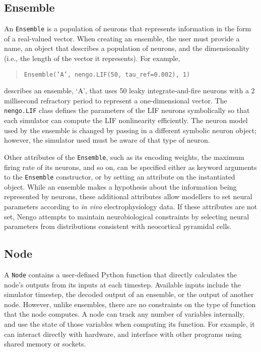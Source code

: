 \documentclass{frontiersSCNS}
\begin{document}
\subsection{Ensemble}

An \texttt{Ensemble} is
a population of neurons
that represents information
in the form of a real-valued vector.
When creating an ensemble,
the user must provide a name,
an object that describes
a population of neurons,
and the dimensionality
(i.e., the length of the vector it represents).
For example,
\begin{quote}
  \texttt{Ensemble('A', nengo.LIF(50, tau\_ref=0.002), 1)}
\end{quote}
describes an ensemble, `A',
that uses 50 leaky integrate-and-fire neurons \citep{lapicque1907}
with a 2 millisecond refractory period
to represent a one-dimensional vector.
The \texttt{nengo.LIF} class defines
the parameters of the LIF neurons symbolically
so that each simulator can compute
the LIF nonlinearity efficiently.
The neuron model used by the ensemble
is changed by passing in a different symbolic neuron object;
however, the simulator used must be aware
of that type of neuron.

Other attributes of the \texttt{Ensemble},
such as its encoding weights,
the maximum firing rate of its neurons,
and so on, can be specified
either as keyword arguments
to the \texttt{Ensemble} constructor,
or by setting an attribute on the instantiated object.
While an ensemble makes a hypothesis
about the information being represented by neurons,
these additional attributes
allow modellers to set
neural parameters according to \textit{in vivo}
electrophysiology data.
If these attributes are not set,
Nengo attempts to maintain
neurobiological constraints
by selecting neural parameters
from distributions consistent with
neocortical pyramidal cells.

\subsection{Node}

A \texttt{Node} contains a user-defined
Python function that directly calculates
the node's outputs from its inputs at each timestep.
Available inputs include
the simulator timestep,
the decoded output of an ensemble,
or the output of another node.
However, unlike ensembles,
there are no constraints on the type
of function that the node computes.
A node can track any number of variables internally,
and use the state of those variables
when computing its function.
For example, it can interact directly with hardware,
and interface with other programs
using shared memory or sockets.
\end{document}
